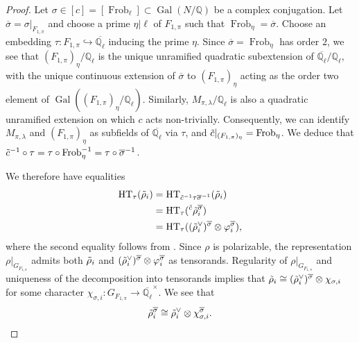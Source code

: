 \documentclass{amsart}
\theoremstyle{definition}
\numberwithin{equation}{section} %
\newcommand{\Qlbar}{\ensuremath{\overline{\mathbb{Q}_\ell}}}
\newcommand{\Frob}{\operatorname{Frob}}
\newcommand{\Gal}{\operatorname{Gal}}
\newcommand{\bb}[1]{\mathbb{#1}}
\newcommand{\ol}[1]{\overline{#1}}
\begin{document}
\begin{proof}
Let $\sigma \in [c] = [\Frob_\ell] \subset \Gal(N / \bb{Q})$ be a complex conjugation.
Let $\ol{\sigma} = \sigma|_{F_{1,\pi}}$ and choose a prime $\eta|\ell$ of $F_{1,\pi}$ such that $\Frob_\eta =  \ol{\sigma}$.
Choose an embedding $\tau: F_{1,\pi} \hookrightarrow \Qlbar$ inducing the prime $\eta$.
Since $\ol{\sigma} = \Frob_\eta$ has order $2$, we see that $(F_{{1,\pi}})_\eta/\bb{Q}_\ell$ is the unique unramified quadratic subextension of $\Qlbar/\bb{Q}_\ell$, with the unique continuous extension of $\ol{\sigma}$ to $(F_{{1,\pi}})_\eta$ acting as the order two element of $\Gal((F_{{1,\pi}})_\eta/\bb{Q}_\ell)$.
Similarly, $M_{\pi,\lambda}/\bb{Q}_\ell$ is also a quadratic unramified extension on which $c$ acts non-trivially.
Consequently, we can identify $M_{\pi,\lambda}$ and $(F_{{1,\pi}})_\eta$ as subfields of $\Qlbar$ via $\tau$, and $\Tilde{c}|_{(F_{{1,\pi}})_\eta} = \Frob_\eta$.
We deduce that $\Tilde{c}^{-1} \circ \tau = \tau \circ \Frob_\eta^{-1} = \tau \circ \ol{\sigma}^{-1}$.

We therefore have equalities
\begin{align*}
    \mathrm{HT}_{\tau}(\Tilde{\rho}_i) 
    & = \mathrm{HT}_{\tilde{c}^{-1} \tau \ol{\sigma}^{-1}}(\Tilde{\rho}_i) \\
    &= \mathrm{HT}_{\tau}({}^{\Tilde{c}}\tilde{\rho}_i^{\ol{\sigma}}) \\
    &= \mathrm{HT}_{\tau}((\Tilde{\rho}_{i}^{\vee})^{\ol{\sigma}} \otimes \varphi_i^{\ol{\sigma}}),
\end{align*}
where the second equality follows from \cite[\S 1]{PatTay15}.
Since $\rho$ is polarizable, the representation $\rho|_{G_{F_{1,\pi}}}$ admits both $\Tilde{\rho}_i$ and $(\Tilde{\rho}_{i}^{\vee})^{\ol{\sigma}} \otimes \varphi_i^{\ol{\sigma}}$ as tensorands.
Regularity of $\rho|_{G_{F_{1,\pi}}}$ and uniqueness of the decomposition into tensorands implies that $ \Tilde{\rho}_i \cong (\Tilde{\rho}_{i}^{\vee})^{\ol{\sigma}} \otimes \chi_{\sigma,i}$ for some character
$\chi_{\sigma,i}: G_{F_{1,\pi}} \to \Qlbar^\times$.
We see that \begin{equation} \label{eqn: CSD tensorand}
\Tilde{\rho}_i^{\ol{\sigma}} \cong \Tilde{\rho}_{i}^{\vee} \otimes \chi_{\sigma,i}^{\ol{\sigma}}.
\end{equation}


\end{proof}
\end{document}
